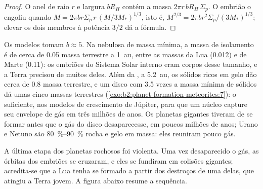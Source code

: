 \begin{proof}
O anel de raio $r$ e largura $bR_H$ contém a massa
$2\pi r\, bR_H\,\Sigma_p$. O embrião o engoliu quando
$M = 2\pi b r\Sigma_p\, r\,(M/3M_*)^{1/3}$, isto é,
$M^{2/3} = 2\pi b r^2\Sigma_p/(3M_*)^{1/3}$; elevar os dois membros à potência
$3/2$ dá a fórmula.
\end{proof}

Os modelos tomam $b \approx 5$. Na nebulosa de massa mínima, a massa de isolamento é
de cerca de \num{0.05} massa terrestre a \qty{1}{au}, entre as massas da
Lua (\num{0.012}) e de Marte (\num{0.11}): os embriões do Sistema Solar interno
eram corpos desse tamanho, e a Terra precisou de muitos deles. Além da , a \qty{5.2}{au}, os sólidos ricos em gelo dão cerca de
\num{0.8} massa terrestre, e um disco com \num{3.5} vezes a massa mínima de
sólidos dá umas cinco massas terrestres (\cref{exo:b2:planet-formation-meteorites:7}): o suficiente, nos modelos de
crescimento de Júpiter, para que um núcleo capture seu envelope de gás em três milhões de anos. Os
planetas gigantes tiveram de se formar antes que o gás do disco desaparecesse, em poucos
milhões de anos; Urano e Netuno são \qtyrange{80}{90}{\percent} rocha e gelo
em massa: eles reuniram pouco gás.

A última etapa dos planetas rochosos foi violenta. Uma vez desaparecido o gás, as
órbitas dos embriões se cruzaram, e eles se fundiram em colisões gigantes; acredita-se que a Lua
tenha se formado a partir dos destroços de uma delas, que atingiu a Terra
jovem. A figura abaixo resume a sequência.


